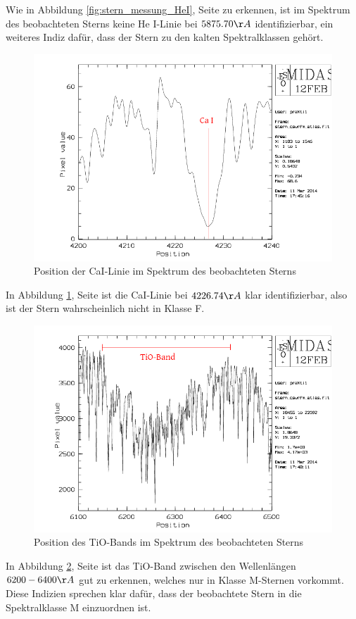 Wie in Abbildung \ref{fig:stern_messung_HeI}, Seite \pageref{fig:stern_messung_HeI} zu erkennen, ist im Spektrum des beobachteten Sterns keine He I-Linie bei $5875.70 \AA$ identifizierbar, ein weiteres Indiz dafür, dass der Stern zu den kalten Spektralklassen gehört.
\\
\begin{figure}
\includegraphics[height=.4\textheight]{images/stern_messung_CaI.png}
\caption{Position der CaI-Linie im Spektrum des beobachteten Sterns}
\label{fig:stern_messung_CaI}
\end{figure}
In Abbildung \ref{fig:stern_messung_CaI}, Seite \pageref{fig:stern_messung_CaI} ist die CaI-Linie bei $4226.74 \AA$ klar identifizierbar, also ist der Stern wahrscheinlich nicht in Klasse F.
\\
\begin{figure}
\includegraphics[height=.4\textheight]{images/stern_messung_TiO.png}
\caption{Position des TiO-Bands im Spektrum des beobachteten Sterns}
\label{fig:stern_messung_TiO}
\end{figure}
In Abbildung \ref{fig:stern_messung_TiO}, Seite \pageref{fig:stern_messung_TiO} ist das TiO-Band zwischen den Wellenlängen $6200 - 6400 \AA$ gut zu erkennen, welches nur in Klasse M-Sternen vorkommt.\
\\
Diese Indizien sprechen klar dafür, dass der beobachtete Stern in die Spektralklasse M einzuordnen ist.

